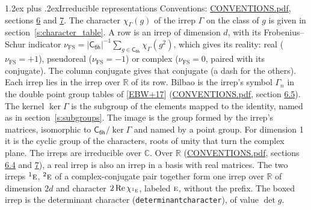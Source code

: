 \documentclass[10pt,a4paper]{article}
\makeatletter
\renewcommand\section{\@startsection{section}{1}{\z@}{-3ex plus -1ex minus -.2ex}%
  {1.2ex plus .2ex}{\normalfont\large\sffamily\bfseries\color{parttitle}}}
\numberwithin{equation}{section}
\newcommand{\grp}[1]{\mathsf{#1}}
\newcommand{\irr}[1]{\text{\normalfont\scshape #1}}
\newcommand{\conjpair}[1]{{}^{#1}}
\newcommand{\irchar}[1]{\chi_{#1}}
\newcommand{\fsind}{\nu_{\mathrm{FS}}}
\makeatother
\begin{document}
\section{Irreducible representations}\label{s:irreps}
Conventions: \href{../../CONVENTIONS.pdf}{CONVENTIONS.pdf}, sections \href{../../CONVENTIONS.pdf\#conv.6}{6} and \href{../../CONVENTIONS.pdf\#conv.7}{7}.
\leavevmode\label{n:function.character}\label{n:irrep.Gamma}The character $\irchar{\Gamma}(g)$ of the irrep $\Gamma$ on the class of $g$ is given in section~\ref{s:character_table}.
\leavevmode\label{n:index.dimension}\label{n:index.frobenius}\label{n:head.irrep}\label{n:head.reality}A row is an irrep of dimension $d$, with its Frobenius--Schur indicator $\fsind = |\grp{C_{6h}}|^{-1}\allowbreak\sum_{g\in\grp{C_{6h}}}\irchar{\Gamma}(g^2)$, which gives its reality: real ($\fsind = +1$), pseudoreal ($\fsind = -1$) or complex ($\fsind = 0$, paired with its conjugate). \label{n:head.conjugate}The column conjugate gives that conjugate (a dash for the others). \label{n:head.over.real}Each irrep lies in the irrep over $\mathbb{R}$ of its row. \label{n:head.bilbao}\label{n:irrep.alias.gamma}Bilbao is the irrep's symbol $\Gamma_n$ in the double point group tables of [\href{../../../REFERENCES.pdf\#ref.EBW+17}{EBW+17}] (\href{../../CONVENTIONS.pdf}{CONVENTIONS.pdf}, section \href{../../CONVENTIONS.pdf\#conv.6.5}{6.5}). \label{n:head.kernel}The kernel $\ker\Gamma$ is the subgroup of the elements mapped to the identity, named as in section~\ref{s:subgroups}. \label{n:head.image}The image is the group formed by the irrep's matrices, isomorphic to $\grp{C_{6h}}/\ker\Gamma$ and named by a point group. For dimension 1 it is the cyclic group of the characters, roots of unity that turn the complex plane. The irreps are irreducible over $\mathbb{C}$. Over $\mathbb{R}$ (\href{../../CONVENTIONS.pdf}{CONVENTIONS.pdf}, sections \href{../../CONVENTIONS.pdf\#conv.6.4}{6.4} and \href{../../CONVENTIONS.pdf\#conv.7}{7}), a real irrep is also an irrep in a basis with real matrices. The two irreps $\conjpair{1}\irr{e}$, $\conjpair{2}\irr{e}$ of a complex-conjugate pair together form one irrep over $\mathbb{R}$ of dimension $2d$ and character $2\operatorname{Re}\irchar{\conjpair{1}\irr{e}}$, labeled $\irr{e}$, without the prefix. \label{n:mark.determinant}The boxed irrep is the determinant character (\texttt{determinantcharacter}), of value $\det g$.
\setlength{\emergencystretch}{2em}\par\setlength{\emergencystretch}{0pt}
\end{document}
